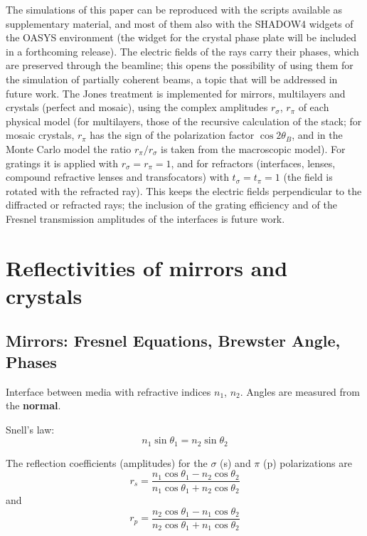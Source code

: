 \documentclass{iucr}
\begin{document}
The simulations of this paper can be reproduced with the scripts available as supplementary material, and most of them also with the SHADOW4 widgets of the OASYS environment (the widget for the crystal phase plate will be included in a forthcoming release). The electric fields of the rays carry their phases, which are preserved through the beamline; this opens the possibility of using them for the simulation of partially coherent beams, a topic that will be addressed in future work. The Jones treatment is implemented for mirrors, multilayers and crystals (perfect and mosaic), using the complex amplitudes $r_\sigma$, $r_\pi$ of each physical model (for multilayers, those of the recursive calculation of the stack; for mosaic crystals, $r_\pi$ has the sign of the polarization factor $\cos2\theta_B$, and in the Monte Carlo model the ratio $r_\pi/r_\sigma$ is taken from the macroscopic model). For gratings it is applied with $r_\sigma=r_\pi=1$, and for refractors (interfaces, lenses, compound refractive lenses and transfocators) with $t_\sigma=t_\pi=1$ (the field is rotated with the refracted ray). This keeps the electric fields perpendicular to the diffracted or refracted rays; the inclusion of the grating efficiency and of the Fresnel transmission amplitudes of the interfaces is future work.



\appendix

\section{Reflectivities of mirrors and crystals}\label{sec:mirrorandcrystals}

\subsection{Mirrors: Fresnel Equations, Brewster Angle, Phases}

Interface between media with refractive indices $n_1$, $n_2$.  
Angles are measured from the \textbf{normal}.

Snell’s law:
\begin{equation}
n_1 \sin\theta_1 = n_2 \sin\theta_2
\end{equation}

The reflection coefficients (amplitudes) for the $\sigma$ (s) and $\pi$ (p) polarizations are
\begin{equation}
r_s =
\frac{n_1 \cos\theta_1 - n_2 \cos\theta_2}
     {n_1 \cos\theta_1 + n_2 \cos\theta_2}
\end{equation}
and
\begin{equation}
r_p =
\frac{n_2 \cos\theta_1 - n_1 \cos\theta_2}
     {n_2 \cos\theta_1 + n_1 \cos\theta_2}
\end{equation}
\end{document}
